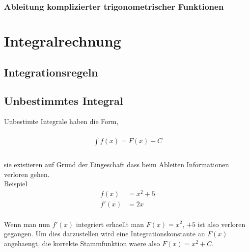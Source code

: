 \documentclass[a4paper]{article} %
\begin{document}
 	\subsubsection{Ableitung komplizierter trigonometrischer Funktionen}
	\pagebreak
	\section{Integralrechnung}
	\subsection{Integrationsregeln}
	\subsection{Unbestimmtes Integral}
	Unbestimte Integrale haben die Form,\\\\
	\begin{align*}
	\int f(x)=F(x)+C\\
	\end{align*}\\
	sie existieren auf Grund der Eingeschaft dass beim Ableiten Informationen verloren gehen.\\
	Beispiel\\
	\begin{align*}
	f(x) & =x^2+5\\
	f'(x) & =2x
	\end{align*}\\
	Wenn man nun $f'(x)$ integriert erhaellt man $F(x) =x^2$, $+5$ ist also verloren gegangen.
	Um dies darzustellen wird eine Integrationskonstante an $F(x)$ angehaengt, die korrekte Stammfunktion waere also $F(x)=x^2+C$.
\end{document}
